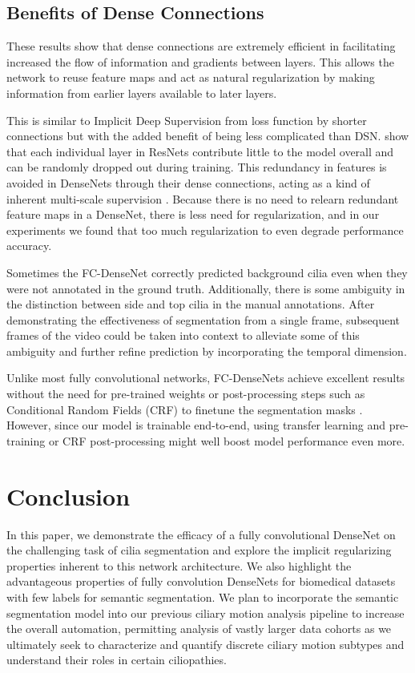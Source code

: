 \documentclass{llncs}
\begin{document}
\subsection{Benefits of Dense Connections}
These results show that dense connections are extremely efficient in facilitating increased the flow of information and gradients between layers. This allows the network to reuse feature maps and act as natural regularization by making information from earlier layers available to later layers. 
\par
This is similar to  Implicit Deep Supervision from loss function by shorter connections but with the added benefit of being less complicated than DSN. \cite{Stochastic} show that each individual layer in ResNets \cite{ResNet} contribute little to the model overall and can be randomly dropped out during training. This redundancy in features is avoided in DenseNets through their dense connections, acting as a kind of inherent multi-scale supervision \cite{DSN}. Because there is no need to relearn redundant feature maps in a DenseNet, there is less need for regularization, and in our experiments we found that too much regularization to even degrade performance accuracy. 
 \par
Sometimes the FC-DenseNet correctly predicted background cilia even when they were not annotated in the ground truth. Additionally, there is some ambiguity in the distinction between side and top cilia in the manual annotations. After demonstrating the effectiveness of segmentation from a single frame, subsequent frames of the video could be taken into context to alleviate some of this ambiguity and further refine prediction by incorporating the temporal dimension. 
 \par
Unlike most fully convolutional networks, FC-DenseNets achieve excellent results without the need for pre-trained weights or post-processing steps such as Conditional Random Fields (CRF) to finetune the segmentation masks  \cite{DeepLab,CRF}. However, since our model is trainable end-to-end, using transfer learning \cite{Transfer} and pre-training or CRF post-processing might well boost model performance even more.  


\section{Conclusion}
In this paper, we demonstrate the efficacy of a fully convolutional DenseNet on the challenging task of cilia segmentation and explore the implicit regularizing properties inherent to this network architecture. We also highlight the advantageous properties of fully convolution DenseNets for biomedical datasets with few labels for semantic segmentation. We plan to incorporate the semantic segmentation model into our previous ciliary motion analysis pipeline to increase the overall automation, permitting analysis of vastly larger data cohorts as we ultimately seek to characterize and quantify discrete ciliary motion subtypes and understand their roles in certain ciliopathies.
\end{document}
